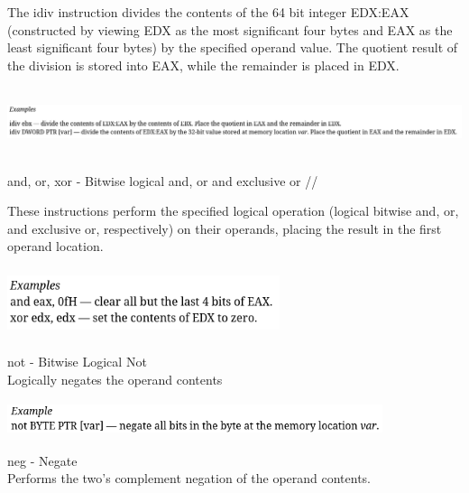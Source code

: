 \documentclass[12pt]{extarticle}
\begin{document}
 The idiv instruction divides the contents of the 64 bit integer EDX:EAX (constructed by viewing EDX as the most significant four bytes and EAX as the least significant four bytes) by the specified operand value. The quotient result of the division is stored into EAX, while the remainder is placed in EDX. 

 \begin{center}

    \includegraphics[width=16cm, height=2cm]{idiv}
    
 \end{center}

 and, or, xor - Bitwise logical and, or and exclusive or //

 These instructions perform the specified logical operation (logical bitwise and, or, and exclusive or, respectively) on their operands, placing the result in the first operand location. 

 \begin{center}

    \includegraphics[width=8cm, height=2cm]{andd}
    
 \end{center}

 not - Bitwise Logical Not \\ 

 Logically negates the operand contents

 \begin{center}

    \includegraphics[width=11cm, height=1cm]{not}
    
 \end{center}

 neg - Negate \\

 Performs the two's complement negation of the operand contents.
\end{document}
